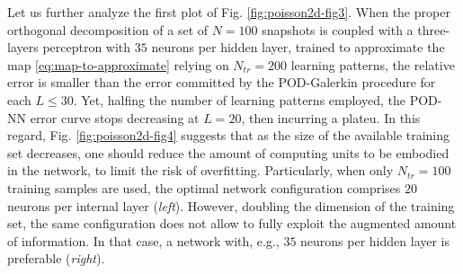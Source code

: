 \documentclass[longtitle]{elsarticle}
\numberwithin{equation}{section}
\theoremstyle{theorem}
\theoremstyle{definition}
\theoremstyle{remark}
\theoremstyle{proposition}
\numberwithin{figure}{section}
\begin{document}
		Let us further analyze the first plot of Fig. \ref{fig:poisson2d-fig3}. When the proper orthogonal decomposition of a set of $N = 100$ snapshots is coupled with a three-layers perceptron with $35$ neurons per hidden layer, trained to approximate the map \eqref{eq:map-to-approximate} relying on $N_{tr} = 200$ learning patterns, the relative error is smaller than the error committed by the POD-Galerkin procedure for each $L \leq 30$. Yet, halfing the number of learning patterns employed, the POD-NN error curve stops decreasing at $L = 20$, then incurring a plateu. In this regard, Fig. \ref{fig:poisson2d-fig4} suggests that as the size of the available training set decreases, one should reduce the amount of computing units to be embodied in the network, to limit the risk of overfitting. Particularly, when only $N_{tr} = 100$ training samples are used, the optimal network configuration comprises $20$ neurons per internal layer (\emph{left}). However, doubling the dimension of the training set, the same configuration does not allow to fully exploit the augmented amount of information. In that case, a network with, e.g., $35$ neurons per hidden layer is preferable (\emph{right}). 
	
\end{document}
